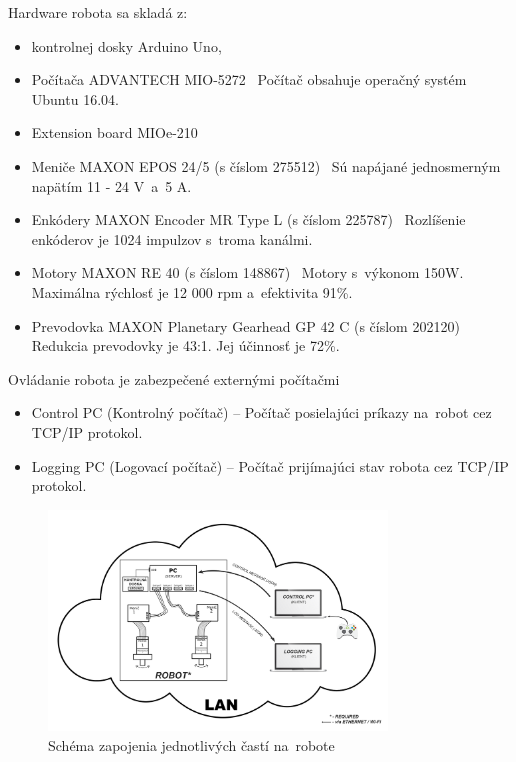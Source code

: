 Hardware robota sa skladá z:
\begin{itemize}
	\item kontrolnej dosky Arduino Uno,

	\item Počítača ADVANTECH MIO-5272~\cite{robotPc} \newline
		Počítač obsahuje operačný systém Ubuntu 16.04.

	\item Extension board MIOe-210~\cite{extensionModule}

	\item Meniče MAXON EPOS 24/5 (s číslom 275512)~\cite{menic} \newline
	 	Sú napájané jednosmerným napätím 11 - 24 V~a~5 A.

	\item Enkódery MAXON Encoder MR Type L (s číslom 225787)~\cite{encoder} \newline
		Rozlíšenie enkóderov je 1024 impulzov s~troma kanálmi.

	\item Motory MAXON RE 40 (s číslom 148867)~\cite{motor} \newline
		Motory s~výkonom 150W. Maximálna rýchlosť je 12 000 rpm a~efektivita 91\%.

	\item Prevodovka MAXON Planetary Gearhead GP 42 C (s číslom 202120)~\cite{prevodovka} \newline
		Redukcia prevodovky je 43:1. Jej účinnosť je 72\%.
\end{itemize}

\noindent Ovládanie robota je zabezpečené externými počítačmi
\begin{itemize}
	\item Control PC (Kontrolný počítač) -- Počítač posielajúci príkazy na~robot cez TCP/IP protokol.
	\item Logging PC (Logovací počítač) -- Počítač prijímajúci stav robota cez TCP/IP protokol.
\end{itemize}

\begin{figure}[!htbp]
	\begin{center}
		\includegraphics[width=9cm]{img/schemaRobota.png}
	\end{center}
	\caption{Schéma zapojenia jednotlivých častí na~robote}
	\label{fig:schemaRobota}
\end{figure}

